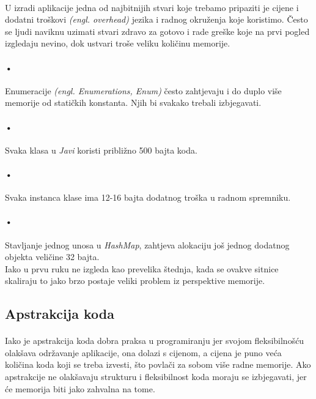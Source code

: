 \documentclass[times, utf8, zavrsni]{fer}
\begin{document}
\paragraph{}
U izradi aplikacije jedna od najbitnijih stvari koje trebamo pripaziti je cijene i dodatni troškovi \textit{(engl. overhead)} jezika i radnog okruženja koje koristimo. Često se ljudi naviknu uzimati stvari zdravo za gotovo i rade greške koje na prvi pogled izgledaju nevino, dok ustvari troše veliku količinu memorije.

\paragraph{•}
Enumeracije \textit{(engl. Enumerations, Enum)} često zahtjevaju i do duplo više memorije od statičkih konstanta. Njih bi svakako trebali izbjegavati.

\paragraph{•}
Svaka klasa u \textit{Javi} koristi približno 500 bajta koda.

\paragraph{•}
Svaka instanca klase ima 12-16 bajta dodatnog troška u radnom spremniku.

\paragraph{•}
Stavljanje jednog unosa u \textit{HashMap}, zahtjeva alokaciju još jednog dodatnog objekta veličine 32 bajta.\\

Iako u prvu ruku ne izgleda kao prevelika štednja, kada se ovakve sitnice  skaliraju to jako brzo postaje veliki problem iz perspektive memorije.

\subsection{Apstrakcija koda}
\paragraph{}
Iako je apstrakcija koda dobra praksa u programiranju jer svojom fleksibilnošću olakšava održavanje aplikacije, ona dolazi s cijenom, a cijena je puno veća količina koda koji se treba izvesti, što povlači za sobom više radne memorije. Ako apstrakcije ne olakšavaju strukturu i fleksibilnost koda moraju se izbjegavati, jer će memorija biti jako zahvalna na tome.
\end{document}

